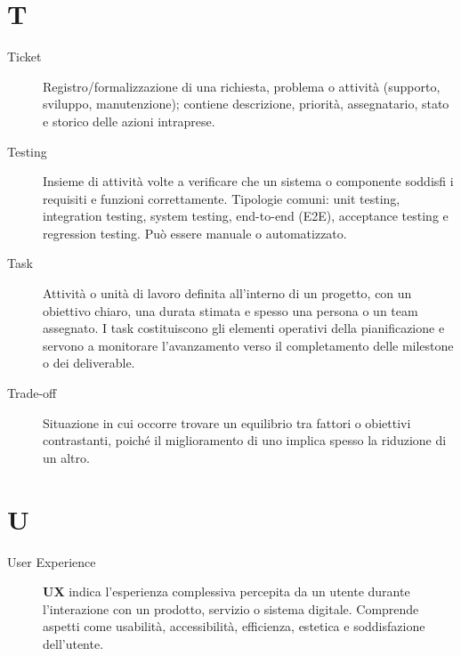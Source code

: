 \section*{T}
\begin{description}
    \item[Ticket] Registro/formalizzazione di una richiesta, problema o attività (supporto, sviluppo, manutenzione); contiene descrizione, priorità, assegnatario, stato e storico delle azioni intraprese.
    \item[Testing] Insieme di attività volte a verificare che un sistema o componente soddisfi i requisiti e funzioni correttamente. Tipologie comuni: unit testing, integration testing, system testing, end-to-end (E2E), acceptance testing e regression testing. Può essere manuale o automatizzato.
    \item[Task] Attività o unità di lavoro definita all’interno di un progetto, con un obiettivo chiaro, una durata stimata e spesso una persona o un team assegnato. I task costituiscono gli elementi operativi della pianificazione e servono a monitorare l’avanzamento verso il completamento delle milestone o dei deliverable.
    \item[Trade-off] Situazione in cui occorre trovare un equilibrio tra fattori o obiettivi contrastanti, poiché il miglioramento di uno implica spesso la riduzione di un altro.  

\end{description}

\section*{U}
\begin{description}
    \item[User Experience] \textbf{UX} indica l’esperienza complessiva percepita da un utente durante l’interazione con un prodotto, servizio o sistema digitale.  
    Comprende aspetti come usabilità, accessibilità, efficienza, estetica e soddisfazione dell’utente.  
\end{description}



